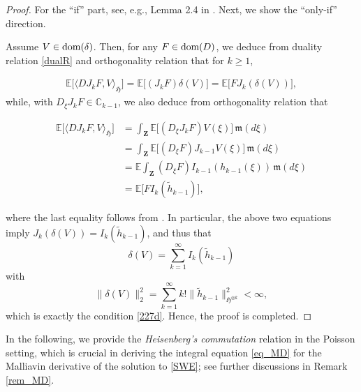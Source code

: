 \documentclass[letterpaper, 11pt,  reqno]{amsart}
\newcommand{\noi}{\noindent}
\newcommand{\C}{\mathbb{C}}
\newcommand{\E}{\mathbb{E}}
\newcommand{\dl}{\delta}
\newcommand{\wt}{\widetilde}
\newcommand{\jb}[1]
{\langle #1 \rangle}
\newcommand{\fm}{\mathfrak{m}}
\newcommand{\fH}{\mathfrak{H}}
\newcommand{\dom}{\textup{dom}}
\numberwithin{equation}{section}
\numberwithin{theorem}{section}
\begin{document}
\begin{proof}
For the ``if'' part, see,  e.g., Lemma 2.4 in \cite{BZ23}. Next, we show the ``only-if'' direction. 

\smallskip

Assume $V\in\dom(\dl)$. Then, for any $F\in\dom(D)$,
we deduce from duality relation \eqref{dualR}
and orthogonality relation  that 
for $k\geq 1$,

\noi
\begin{align*}
\E\big[ \jb{D J_k F, V}_\fH \big] 
=  \E\big[ (J_k F) \dl(V) \big]  = \E\big[ F J_k (\dl(V)) \big],
\end{align*}
while, with $D_\xi J_k F\in\C_{k-1}$, we also deduce from orthogonality relation  that 


\noi
\begin{align*}
\E\big[ \jb{D J_k F, V}_\fH \big] 
&= \int_{\mathbf{Z}} \E\big[  (D_\xi J_k F) V(\xi) \big]\, \fm(d\xi) \\
&=  \int_{\mathbf{Z}} \E\big[  (D_\xi  F)  J_{k-1}V(\xi) \big]\, \fm(d\xi) \\
&=  \E \int_{\mathbf{Z}}    (D_\xi  F)  I_{k-1} ( h_{k-1}(\xi)) \, \fm(d\xi) \\
&= \E\big[ F I_k(\wt h_{k-1}) \big],
\end{align*}

\noi
where the last equality follows from  \cite[Lemma 2.4]{BZ23}. In particular, the above 
two equations imply $J_k ( \dl (V) ) = I_k(\wt h_{k-1}) $, and thus that 
\[
\dl(V) = \sum_{k=1}^\infty  I_k(\wt h_{k-1})
\]
with 
\[
\| \dl(V)\|_2^2 = \sum_{k=1}^\infty k!  \| \wt h_{k-1} \|^2_{\fH^{\otimes k}} <\infty,
\]
which is exactly the condition \eqref{227d}. Hence, the proof is completed. \qedhere


\end{proof}



 

 
In the following, we provide the {\it Heisenberg's commutation} relation in 
the Poisson setting, which is crucial in deriving 
the integral equation \eqref{eq_MD} for the Malliavin derivative 
of the solution to \eqref{SWE};
see further discussions in Remark \ref{rem_MD}.
\end{document}
